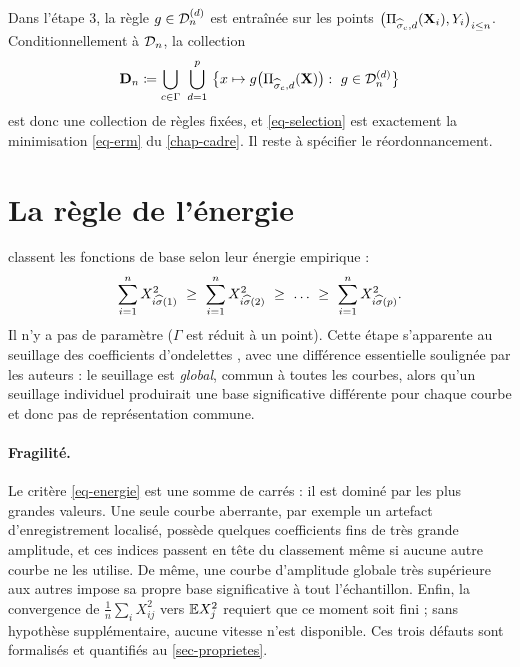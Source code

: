 Dans l'étape 3, la règle $g\in\mathcal{D}_n^{(d)}$ est entraînée sur les points $\bigl(\Pi_{\widehat{\sigma}_c,d}(\mathbf{X}_i),Y_i\bigr)_{i\le n}$. Conditionnellement à $\mathcal{D}_n$, la collection
\begin{equation}\label{eq-collection}
  \mathbf{D}_n\coloneqq\bigcup_{c\in\Gamma}\ \bigcup_{d=1}^{p}\ \bigl\{x\mapsto g\bigl(\Pi_{\widehat{\sigma}_c,d}(\mathbf{X})\bigr):\ g\in\mathcal{D}_n^{(d)}\bigr\}
\end{equation}
est donc une collection de règles fixées, et \eqref{eq-selection} est exactement la minimisation \eqref{eq-erm} du \cref{chap-cadre}. Il reste à spécifier le réordonnancement.

\section{La règle de l'énergie}\label{sec-energie}

\citet{berlinet2008functional} classent les fonctions de base selon leur énergie empirique :
\begin{equation}\label{eq-energie}
  \sum_{i=1}^nX_{i\hsigma(1)}^2\ \ge\ \sum_{i=1}^nX_{i\hsigma(2)}^2\ \ge\ \dots\ \ge\ \sum_{i=1}^nX_{i\hsigma(p)}^2 .
\end{equation}
Il n'y a pas de paramètre ($\Gamma$ est réduit à un point). Cette étape s'apparente au seuillage des coefficients d'ondelettes \citep{donoho1995wavelet}, avec une différence essentielle soulignée par les auteurs : le seuillage est \emph{global}, commun à toutes les courbes, alors qu'un seuillage individuel produirait une base significative différente pour chaque courbe et donc pas de représentation commune.

\paragraph{Fragilité.} Le critère \eqref{eq-energie} est une somme de carrés : il est dominé par les plus grandes valeurs. Une seule courbe aberrante, par exemple un artefact d'enregistrement localisé, possède quelques coefficients fins de très grande amplitude, et ces indices passent en tête du classement même si aucune autre courbe ne les utilise. De même, une courbe d'amplitude globale très supérieure aux autres impose sa propre base significative à tout l'échantillon. Enfin, la convergence de $\frac1n\sum_iX_{ij}^2$ vers $\mathbb{E} X_j^2$ requiert que ce moment soit fini ; sans hypothèse supplémentaire, aucune vitesse n'est disponible. Ces trois défauts sont formalisés et quantifiés au \cref{sec-proprietes}.

